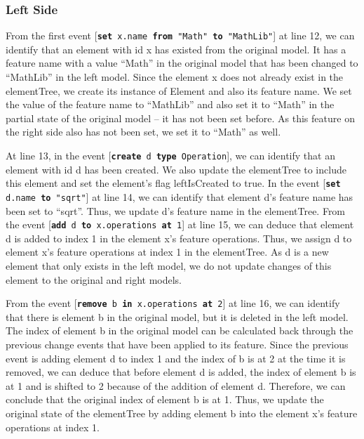 \documentclass{jot}
\newcommand{\dk}[1]{\textcolor{blue}{\textbf{[Dimitris: #1]}}}
\begin{document}
    \subsubsection{Left Side}
    \label{sec:left_side}
    From the first event [\texttt{\small \textbf{set} x.name \textbf{from} "Math" \textbf{to} "MathLib"}] at line 12, we can identify that an element with id \textsf{x} has existed from the original model. 
    It has a feature \textsf{name} with a value ``Math'' in the original model that has been changed to ``MathLib'' in the left model. Since the element \textsf{x} does not already exist in the \textsf{elementTree}, we create its instance of \textsf{Element} and also its feature \textsf{name}. We set the value of the feature \textsf{name} to ``MathLib'' and also set it to ``Math'' in the partial state of the original model -- it has not been set before. As this feature on the right side also has not been set, we set it to ``Math'' as well. 
    
    At line 13, in the event [\texttt{\small \textbf{create} d \textbf{type} Operation}], we can identify that an element with id \textsf{d} has been created. We also update the \textsf{elementTree} to include this element and set the element's flag \textsf{leftIsCreated} to \textsf{true}. In the event [\texttt{\small \textbf{set} d.name \textbf{to} "sqrt"}] at line 14, we can identify that element \textsf{d}'s feature \textsf{name} has been set to ``sqrt''. Thus, we update \textsf{d}'s feature \textsf{name} in the \textsf{elementTree}. From the event [\texttt{\small \textbf{add} d \textbf{to} x.operations \textbf{at} 1}] at line 15, we can deduce that element \textsf{d} is added to index 1 in the element \textsf{x}'s feature \textsf{operations}. Thus, we assign \textsf{d} to element \textsf{x}'s feature \textsf{operations} at index 1 in the \textsf{elementTree}. As \textsf{d} is a new element that only exists in the left model, we do not update changes of this element to the original and right models. 
    
    From the event [\texttt{\small \textbf{remove} b \textbf{in} x.operations \textbf{at} 2}] at line 16, we can identify that there is element \textsf{b} in the original model, but it is deleted in the left model. The index of element \textsf{b} in the original model can be calculated back through the previous change events that have been applied to its feature. Since the previous event is adding element \textsf{d} to index 1 and the index of \textsf{b} is at 2 at the time it is removed, we can deduce that before element \textsf{d} is added, the index of element \textsf{b} is at 1 and is shifted to 2 because of the addition of element \textsf{d}.  Therefore, we can conclude that the original index of element \textsf{b} is at 1. Thus, we update the original state of the \textsf{elementTree} by adding element \textsf{b} into the element \textsf{x}'s feature \textsf{operations} at index 1.  
    
\end{document}
